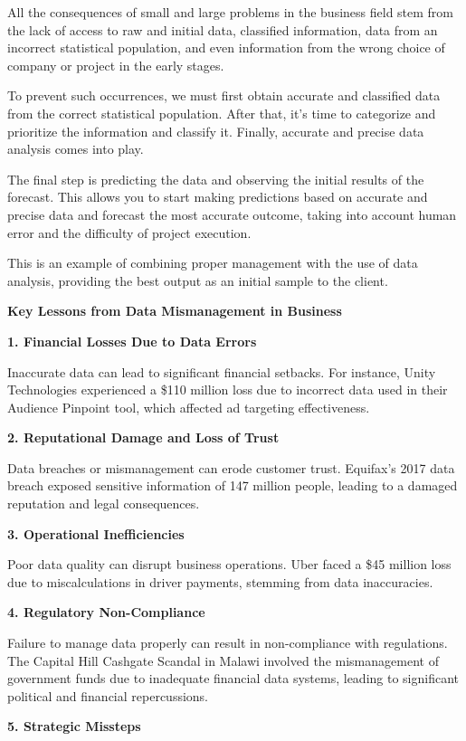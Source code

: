 \documentclass[
  man,
  floatsintext,
  longtable,
  nolmodern,
  notxfonts,
  notimes,
  colorlinks=true,linkcolor=blue,citecolor=blue,urlcolor=blue]{apa7}
\begin{document}
All the consequences of small and large problems in the business field
stem from the lack of access to raw and initial data, classified
information, data from an incorrect statistical population, and even
information from the wrong choice of company or project in the early
stages.

To prevent such occurrences, we must first obtain accurate and
classified data from the correct statistical population. After that,
it's time to categorize and prioritize the information and classify it.
Finally, accurate and precise data analysis comes into play.

The final step is predicting the data and observing the initial results
of the forecast. This allows you to start making predictions based on
accurate and precise data and forecast the most accurate outcome, taking
into account human error and the difficulty of project execution.

This is an example of combining proper management with the use of data
analysis, providing the best output as an initial sample to the client.

\textbf{Key Lessons from Data Mismanagement in Business}

\textbf{1. Financial Losses Due to Data Errors}

Inaccurate data can lead to significant financial setbacks. For
instance, Unity Technologies experienced a \$110 million loss due to
incorrect data used in their Audience Pinpoint tool, which affected ad
targeting effectiveness.

\textbf{2. Reputational Damage and Loss of Trust}

Data breaches or mismanagement can erode customer trust. Equifax's 2017
data breach exposed sensitive information of 147 million people, leading
to a damaged reputation and legal consequences.

\textbf{3. Operational Inefficiencies}

Poor data quality can disrupt business operations. Uber faced a \$45
million loss due to miscalculations in driver payments, stemming from
data inaccuracies.

\textbf{4. Regulatory Non-Compliance}

Failure to manage data properly can result in non-compliance with
regulations. The Capital Hill Cashgate Scandal in Malawi involved the
mismanagement of government funds due to inadequate financial data
systems, leading to significant political and financial repercussions.

\textbf{5. Strategic Missteps}
\end{document}
